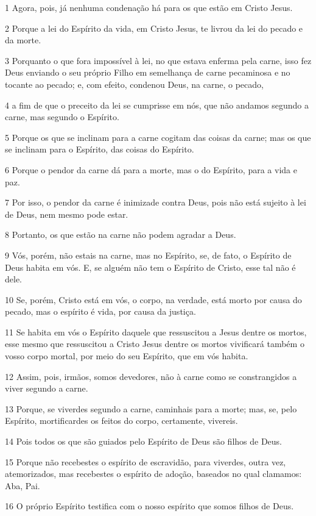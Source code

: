 \par 1 Agora, pois, já nenhuma condenação há para os que estão em Cristo Jesus.
\par 2 Porque a lei do Espírito da vida, em Cristo Jesus, te livrou da lei do pecado e da morte.
\par 3 Porquanto o que fora impossível à lei, no que estava enferma pela carne, isso fez Deus enviando o seu próprio Filho em semelhança de carne pecaminosa e no tocante ao pecado; e, com efeito, condenou Deus, na carne, o pecado,
\par 4 a fim de que o preceito da lei se cumprisse em nós, que não andamos segundo a carne, mas segundo o Espírito.
\par 5 Porque os que se inclinam para a carne cogitam das coisas da carne; mas os que se inclinam para o Espírito, das coisas do Espírito.
\par 6 Porque o pendor da carne dá para a morte, mas o do Espírito, para a vida e paz.
\par 7 Por isso, o pendor da carne é inimizade contra Deus, pois não está sujeito à lei de Deus, nem mesmo pode estar.
\par 8 Portanto, os que estão na carne não podem agradar a Deus.
\par 9 Vós, porém, não estais na carne, mas no Espírito, se, de fato, o Espírito de Deus habita em vós. E, se alguém não tem o Espírito de Cristo, esse tal não é dele.
\par 10 Se, porém, Cristo está em vós, o corpo, na verdade, está morto por causa do pecado, mas o espírito é vida, por causa da justiça.
\par 11 Se habita em vós o Espírito daquele que ressuscitou a Jesus dentre os mortos, esse mesmo que ressuscitou a Cristo Jesus dentre os mortos vivificará também o vosso corpo mortal, por meio do seu Espírito, que em vós habita.
\par 12 Assim, pois, irmãos, somos devedores, não à carne como se constrangidos a viver segundo a carne.
\par 13 Porque, se viverdes segundo a carne, caminhais para a morte; mas, se, pelo Espírito, mortificardes os feitos do corpo, certamente, vivereis.
\par 14 Pois todos os que são guiados pelo Espírito de Deus são filhos de Deus.
\par 15 Porque não recebestes o espírito de escravidão, para viverdes, outra vez, atemorizados, mas recebestes o espírito de adoção, baseados no qual clamamos: Aba, Pai.
\par 16 O próprio Espírito testifica com o nosso espírito que somos filhos de Deus.
